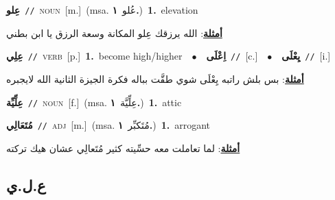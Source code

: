 \documentclass[10pt,a4paper,twoside]{article} %
\begin{document}
\begin{multicols}{2}
{\setlength\topsep{0pt}\textbf{\foreignlanguage{arabic}{عِلو}}\ {\color{gray}\texttt{//}\color{black}}\ \textsc{noun}\ [m.]\ \color{gray}(msa. \foreignlanguage{arabic}{عُلو}~\foreignlanguage{arabic}{\textbf{١.}})\color{black}\ \textbf{1.}~elevation\  \begin{flushright}\color{gray}\foreignlanguage{arabic}{\textbf{\underline{\foreignlanguage{arabic}{أمثلة}}}: الله يرزقك عِلو المكانة وسعة الرزق يا ابن بطني}\end{flushright}\color{black}} \vspace{2mm}

{\setlength\topsep{0pt}\textbf{\foreignlanguage{arabic}{عِلِي}}\ {\color{gray}\texttt{//}\color{black}}\ \textsc{verb}\ [p.]\ \textbf{1.}~become high/higher\ \ $\bullet$\ \ \setlength\topsep{0pt}\textbf{\foreignlanguage{arabic}{اِعْلَى}}\ {\color{gray}\texttt{//}\color{black}}\ [c.]\ \ $\bullet$\ \ \setlength\topsep{0pt}\textbf{\foreignlanguage{arabic}{يِعْلَى}}\ {\color{gray}\texttt{//}\color{black}}\ [i.]\  \begin{flushright}\color{gray}\foreignlanguage{arabic}{\textbf{\underline{\foreignlanguage{arabic}{أمثلة}}}: بس بلش راتبه يِعْلَى شوي طقَّت بباله فكرة الجيزة الثانية الله لايجبره}\end{flushright}\color{black}} \vspace{2mm}

{\setlength\topsep{0pt}\textbf{\foreignlanguage{arabic}{عِلِّيِّة}}\ {\color{gray}\texttt{//}\color{black}}\ \textsc{noun}\ [f.]\ \color{gray}(msa. \foreignlanguage{arabic}{عِلِّيَّة}~\foreignlanguage{arabic}{\textbf{١.}})\color{black}\ \textbf{1.}~attic\ } \vspace{2mm}

{\setlength\topsep{0pt}\textbf{\foreignlanguage{arabic}{مُتَعَالِي}}\ {\color{gray}\texttt{//}\color{black}}\ \textsc{adj}\ [m.]\ \color{gray}(msa. \foreignlanguage{arabic}{مُتَكبِّر}~\foreignlanguage{arabic}{\textbf{١.}})\color{black}\ \textbf{1.}~arrogant\  \begin{flushright}\color{gray}\foreignlanguage{arabic}{\textbf{\underline{\foreignlanguage{arabic}{أمثلة}}}: لما تعاملت معه حسِّيته كثير مُتَعالِي عشان هيك تركته}\end{flushright}\color{black}} \vspace{2mm}

\vspace{-3mm}
\subsection*{\color{blue}\foreignlanguage{arabic}{ع.ل.ي}\color{blue}{}} 


\end{multicols}
\end{document}
